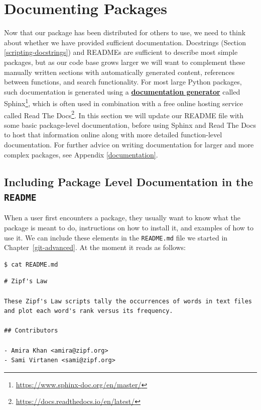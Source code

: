 \documentclass[
]{krantz}
\renewcommand{\href}[2]{#2\footnote{\url{#1}}}
\newcommand{\gref}[2]{\hyperlink{#2}{\textbf{#1}}}
\begin{document}
\hypertarget{packaging-document}{%
\section{Documenting Packages}\label{packaging-document}}

Now that our package has been distributed for others to use,
we need to think about whether we have provided sufficient documentation.
Docstrings (Section \ref{scripting-docstrings}) and READMEs
are sufficient to describe most simple packages,
but as our code base grows larger
we will want to complement these manually written sections with automatically generated content,
references between functions,
and search functionality.
For most large Python packages,
such documentation is generated using a \gref{documentation generator}{documentation\_generator}
called \href{https://www.sphinx-doc.org/en/master/}{Sphinx},
which is often used in combination with a free online hosting service called
\href{https://docs.readthedocs.io/en/latest/}{Read The Docs}.
In this section we will update our README file with some basic package-level documentation,
before using Sphinx and Read The Docs to host that information online
along with more detailed function-level documentation.
For further advice on writing documentation for larger and more complex packages,
see Appendix \ref{documentation}.

\hypertarget{packaging-readme}{%
\subsection{\texorpdfstring{Including Package Level Documentation in the \texttt{README}}{Including Package Level Documentation in the README}}\label{packaging-readme}}

When a user first encounters a package,
they usually want to know what the package is meant to do,
instructions on how to install it,
and examples of how to use it.
We can include these elements in the \texttt{README.md} file we started in Chapter~\ref{git-advanced}.
At the moment it reads as follows:

\begin{verbatim}
$ cat README.md
\end{verbatim}

\begin{verbatim}
# Zipf's Law

These Zipf's Law scripts tally the occurrences of words in text files
and plot each word's rank versus its frequency.

## Contributors

- Amira Khan <amira@zipf.org>
- Sami Virtanen <sami@zipf.org>
\end{verbatim}
\end{document}

